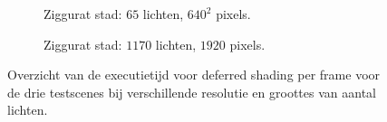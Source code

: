 \begin{figure}[p]
\begin{adjustbox}{minipage=\textwidth, scale=0.6}
\begin{subfigure}[b]{0.83\textwidth}
      \caption{Ziggurat stad: $65$ lichten, $640^2$ pixels.}
      \label{fig:ts-frames-deferred:city-low}
    \end{subfigure}
  \end{adjustbox} %
  \begin{adjustbox}{minipage=\textwidth, scale=0.6}
    \begin{subfigure}[b]{0.83\textwidth}
      \centering
      \def\svgwidth{\textwidth}
      
      \caption{Ziggurat stad: $1170$ lichten, $1920$ pixels.}
      \label{fig:ts-frames-deferred:city-high}
    \end{subfigure}
  \end{adjustbox}
  \caption{Overzicht van de executietijd voor deferred shading per frame voor de
           drie testscenes bij verschillende resolutie en groottes van aantal
           lichten.}
  \label{fig:ts-frames-deferred}
\end{figure}

